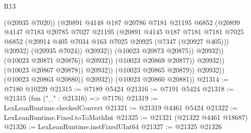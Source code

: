 \begin{lexlean}{R13}
\begin{coremodule}
                                              (@20935 @7020))
                                            (@20891
                                              @4148
                                              @187
                                              @20786
                                              @7181
                                              @21195
                                              @6852
                                              (@20899
                                                @4147
                                                @7183
                                                @20785
                                                @7027
                                                @21195
                                                (@20891
                                                  @4145
                                                  @187
                                                  @7181
                                                  @7181
                                                  @7025
                                                  @6852
                                                  (@20914
                                                    @405
                                                    @7034
                                                    @163
                                                    @7025
                                                    @20925
                                                    (@7347 (@20927 @405)))
                                                  @20932)
                                                (@20935 @7024))
                                              @20932))
                                          (@10023 @20873 @20875))
                                        @20932))
                                    (@10023 @20871 @20876))
                                  @20932))
                              (@10023 @20869 @20877))
                            @20932))
                        (@10023 @20867 @20878))
                      @20932))
                  (@10023 @20865 @20879))
                @20932))
            (@10023 @20863 @20880))
          @20932))
      (@10023 @20860 @20881))
@21314 := @7180 @10229
@21315 := @7189 @5424
@21316 := @7191 @5424
@21318 := @21315 (fun ("_" : @21316) => @7176)
@21319 := LexLeanRuntime.checkedConvert
@21321 := @21319 @4461 @5424
@21322 := LexLeanRuntime.Fixed.toToMathInt
@21325 := @21321 (@21322 @4461 @18687)
@21326 := LexLeanRuntime.instFixedUInt64
@21327 := @21325 @21326

\end{coremodule}
\end{lexlean}
